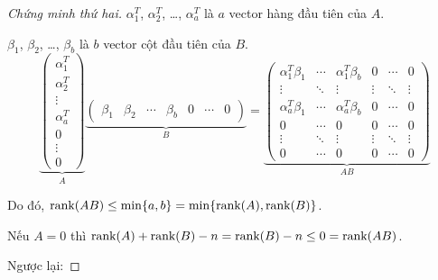 \begin{proof}[Chứng minh thứ hai]
    $\alpha_{1}^{T}$, $\alpha_{2}^{T}$, \ldots, $\alpha_{a}^{T}$ là $a$ vector hàng đầu tiên của $A$.
    
    $\beta_{1}$, $\beta_{2}$, \ldots, $\beta_{b}$ là $b$ vector cột đầu tiên của $B$.
    \[
        \underbrace{\begin{pmatrix}
                \alpha_{1}^{T} \\
                \alpha_{2}^{T} \\
                \vdots         \\
                \alpha_{a}^{T} \\
                0              \\
                \vdots         \\
                0
            \end{pmatrix}}_{A}
        \underbrace{\begin{pmatrix}
                \beta_{1} & \beta_{2} & \cdots & \beta_{b} & 0 & \cdots & 0
            \end{pmatrix}}_{B}
        =
        \underbrace{\begin{pmatrix}
                \alpha_{1}^{T}\beta_{1} & \cdots & \alpha_{1}^{T}\beta_{b} & 0      & \cdots & 0      \\
                \vdots                  & \ddots & \vdots                  & \vdots & \ddots & \vdots \\
                \alpha_{a}^{T}\beta_{1} & \cdots & \alpha_{a}^{T}\beta_{b} & 0      & \cdots & 0      \\
                0                       & \cdots & 0                       & 0      & \cdots & 0      \\
                \vdots                  & \ddots & \vdots                  & \vdots & \ddots & \vdots \\
                0                       & \cdots & 0                       & 0      & \cdots & 0
            \end{pmatrix}}_{AB}
    \]
    
    Do đó, $\text{rank}(AB)\le \min\{ a, b \} = \min\{ \text{rank}(A), \text{rank}(B) \}$.
    
    \bigskip
    
    Nếu $A = 0$ thì $\text{rank}(A) + \text{rank}(B) - n = \text{rank}(B) - n\le 0 = \text{rank}(AB)$.
    
    Ngược lại:
    

\end{proof}
